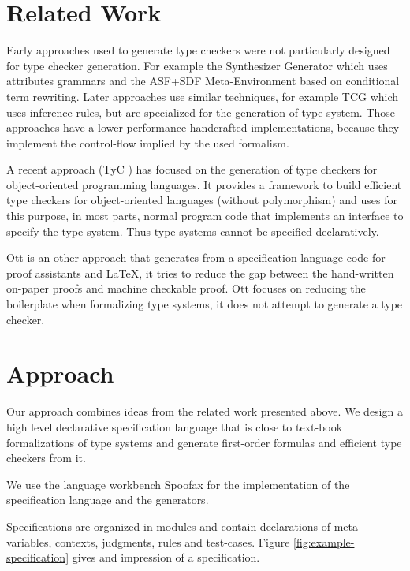 \documentclass[preprint]{sigplanconf}
\begin{document}
\section{Related Work}
Early approaches used to generate type checkers were not particularly
designed for type checker generation. For example the Synthesizer
Generator \cite{Reps:1984:SG:800020.808247} which uses attributes
grammars and the ASF+SDF Meta-Environment
\cite{vandenBrand:2001:AMC:647477.727788} based on conditional term
rewriting. Later approaches use similar techniques, for example TCG
\cite{phd/de/Gast2005} which uses inference rules, but are specialized
for the generation of type system. Those approaches have a lower
performance handcrafted implementations, because they implement the
control-flow implied by the used formalism.

A recent approach (TyC \cite{ortin2014automatic}) has focused on the
generation of type checkers for object-oriented programming
languages. It provides a framework to build efficient type checkers
for object-oriented languages (without polymorphism) and uses for this
purpose, in most parts, normal program code that implements an
interface to specify the type system. Thus type systems cannot be
specified declaratively.

Ott \cite{journals/jfp/SewellNOPRSS10} is an other approach that
generates from a specification language code for proof assistants and
\LaTeX, it tries to reduce the gap between the hand-written on-paper
proofs and machine checkable proof. Ott focuses on reducing the
boilerplate when formalizing type systems, it does not attempt to
generate a type checker.
\section{Approach}
Our approach combines ideas from the related work presented above. We
design a high level declarative specification language that is close
to text-book formalizations of type systems and generate first-order
formulas and efficient type checkers from it.

We use the language workbench Spoofax \cite{KatsVisser2010} for the
implementation of the specification language and the generators. 

Specifications are organized in modules and contain declarations of
meta-variables, contexts, judgments, rules and test-cases. Figure
\ref{fig:example-specification} gives and impression of a
specification.
\end{document}
